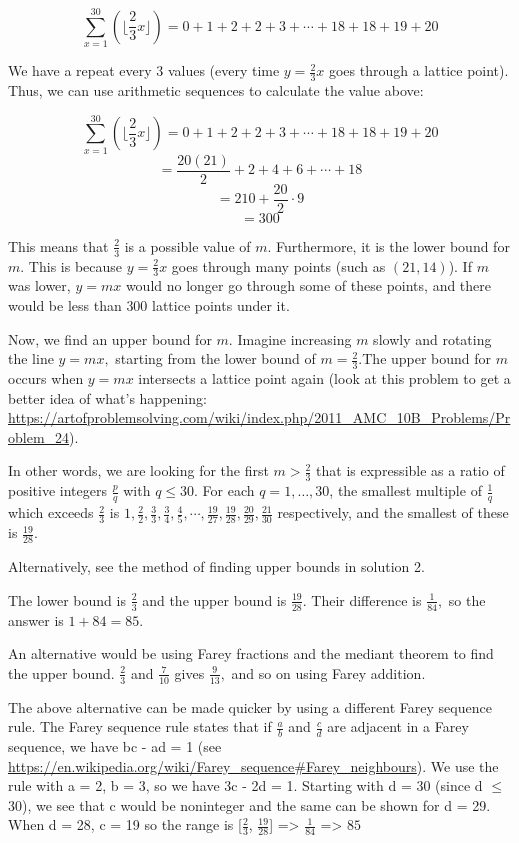 \begin{enumerate}
 
 \[\sum_{x=1}^{30}(\lfloor \frac{2}{3}x \rfloor) = 0 + 1 + 2 + 2 + 3 + \cdots + 18 + 18 + 19 + 20\]

 We have a repeat every $3$ values (every time $y=\frac{2}{3}x$ goes through a lattice point). Thus, we can use arithmetic sequences to calculate the value above:

 
 \[\sum_{x=1}^{30}(\lfloor \frac{2}{3}x \rfloor) = 0 + 1 + 2 + 2 + 3 + \cdots + 18 + 18 + 19 + 20\]
 \[=\frac{20(21)}{2} + 2 + 4 + 6 + \cdots + 18\]
 \[=210 + \frac{20}{2}\cdot 9\]
 \[=300\]

 This means that $\frac{2}{3}$ is a possible value of $m.$ Furthermore, it is the lower bound for $m.$ This is because $y=\frac{2}{3}x$ goes through many points (such as $(21, 14)$). If $m$ was lower, $y=mx$ would no longer go through some of these points, and there would be less than $300$ lattice points under it.

 Now, we find an upper bound for $m.$ Imagine increasing $m$ slowly and rotating the line $y=mx,$ starting from the lower bound of $m=\frac{2}{3}.$The upper bound for $m$ occurs when $y=mx$ intersects a lattice point again (look at this problem to get a better idea of what's happening: \href{https://artofproblemsolving.com/wiki/index.php/2011\_AMC\_10B\_Problems/Problem\_24}{https://artofproblemsolving.com/wiki/index.php/2011\_AMC\_10B\_Problems/Problem\_24}).

 In other words, we are looking for the first $m > \frac{2}{3}$ that is expressible as a ratio of positive integers $\frac{p}{q}$ with $q \le 30.$ For each $q=1,\dots,30$, the smallest multiple of $\frac{1}{q}$ which exceeds $\frac{2}{3}$ is $1, \frac{2}{2}, \frac{3}{3}, \frac{3}{4}, \frac{4}{5}, \cdots , \frac{19}{27}, \frac{19}{28}, \frac{20}{29}, \frac{21}{30}$ respectively, and the smallest of these is $\frac{19}{28}.$

 Alternatively, see the method of finding upper bounds in solution 2.

 The lower bound is $\frac{2}{3}$ and the upper bound is $\frac{19}{28}.$ Their difference is $\frac{1}{84},$ so the answer is $1 + 84 = \boxed{85}.$

 An alternative would be using Farey fractions and the mediant theorem to find the upper bound. $\frac{2}{3}$ and $\frac{7}{10}$ gives $\frac{9}{13},$ and so on using Farey addition. 

 The above alternative can be made quicker by using a different Farey sequence rule. The Farey sequence rule states that if $\frac{a}{b}$ and $\frac{c}{d}$ are adjacent in a Farey sequence, we have bc - ad = 1 (see \href{https://en.wikipedia.org/wiki/Farey\_sequence\#Farey\_neighbours}{https://en.wikipedia.org/wiki/Farey\_sequence\#Farey\_neighbours}). We use the rule with a = 2, b = 3, so we have 3c - 2d = 1. Starting with d = 30 (since d $\leq$ 30), we see that c would be noninteger and the same can be shown for d = 29. When d = 28, c = 19 so the range is [$\frac{2}{3}$, $\frac{19}{28}$] => $\frac{1}{84}$ => $\boxed{85}$


\end{enumerate}
